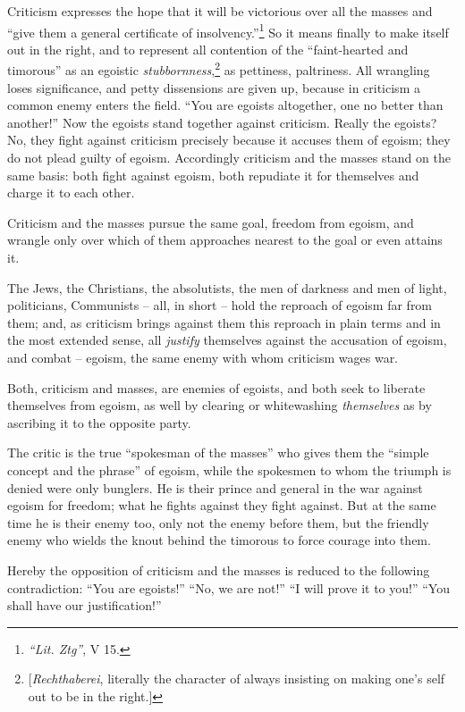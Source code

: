 Criticism expresses the hope that it will be victorious over all the masses 
and ``give them a general certificate of 
insolvency.''\footnote{\textit{``Lit. Ztg''}, V 15.} So it means finally to 
make itself out in the right, and to represent all contention of the 
``faint-hearted and timorous'' as an egoistic 
\textit{stubbornness},\footnote{[\textit{Rechthaberei}, literally the 
character of always insisting on making one's self out to be in the right.]} 
as pettiness, paltriness. All wrangling loses significance, and petty 
dissensions are given up, because in criticism a common enemy enters the 
field. ``You are egoists altogether, one no better than another!'' Now the 
egoists stand together against criticism. Really the egoists? No, they fight 
against criticism precisely because it accuses them of egoism; they do not 
plead guilty of egoism. Accordingly criticism and the masses stand on the same 
basis: both fight against egoism, both repudiate it for themselves and charge 
it to each other.

Criticism and the masses pursue the same goal, freedom from egoism, and 
wrangle only over which of them approaches nearest to the goal or even attains 
it.

The Jews, the Christians, the absolutists, the men of darkness and men of 
light, politicians, Communists -- all, in short -- hold the reproach of egoism 
far from them; and, as criticism brings against them this reproach in plain 
terms and in the most extended sense, all \textit{justify} themselves against 
the accusation of egoism, and combat -- egoism, the same enemy with whom 
criticism wages war.

Both, criticism and masses, are enemies of egoists, and both seek to liberate 
themselves from egoism, as well by clearing or whitewashing 
\textit{themselves} as by ascribing it to the opposite party.

The critic is the true ``spokesman of the masses'' who gives them the 
``simple concept and the phrase'' of egoism, while the spokesmen to whom the 
triumph is denied were only bunglers. He is their prince and general in the 
war against egoism for freedom; what he fights against they fight against. But 
at the same time he is their enemy too, only not the enemy before them, but 
the friendly enemy who wields the knout behind the timorous to force courage 
into them.

Hereby the opposition of criticism and the masses is reduced to the following 
contradiction: ``You are egoists!'' ``No, we are not!'' ``I will prove it 
to you!'' ``You shall have our justification!''

